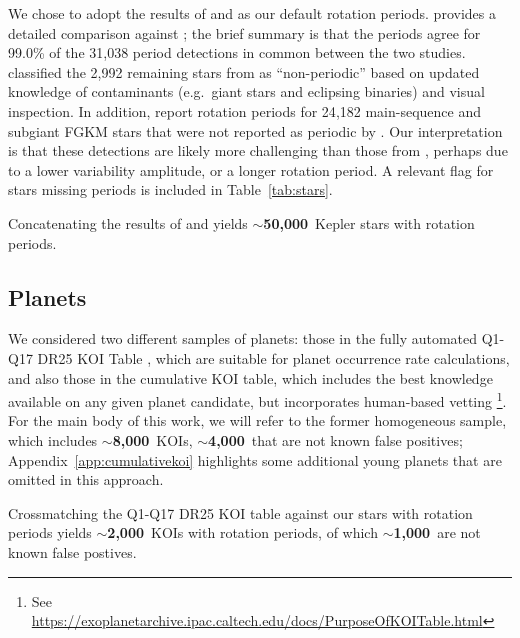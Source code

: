 \documentclass[12pt,twocolumn,tighten]{aastex63}
\newcommand{\nstarswithprot}{{\bf $\sim$50{,}000}}
\newcommand{\nkois}{{\bf $\sim$8{,}000}} %
\newcommand{\nkoisnofp}{{\bf $\sim$4{,}000}} %
\newcommand{\nkoiswithprot}{{\bf $\sim$2{,}000}}
\newcommand{\nkoisnofpwithprot}{{\bf $\sim$1{,}000}}
\begin{document}
We chose to adopt the results of  and
 as our default rotation periods.
 provides a detailed comparison against
; the brief summary is that the periods
agree for 99.0\% of the 31{,}038 period detections in common between
the two studies.   classified the 2{,}992
remaining stars from  as ``non-periodic''
based on updated knowledge of contaminants (e.g.~giant stars and
eclipsing binaries) and visual inspection.  In addition,
 report rotation periods for 24{,}182
main-sequence and subgiant FGKM stars that were not reported as
periodic by .  Our interpretation is that
these detections are likely more challenging than those from
, perhaps due to a lower variability
amplitude, or a longer rotation period.  A relevant flag for stars
missing  periods is included in
Table~\ref{tab:stars}.

Concatenating the results of  and
 yields \nstarswithprot\ Kepler stars with
rotation periods.

\subsection{Planets}
\label{subsec:planetsel}

We considered two different samples of planets: those in the fully
automated Q1-Q17 DR25 KOI Table \citep{Thompson_2018}, which are
suitable for planet occurrence rate calculations, and also those in
the cumulative KOI table, which includes the best knowledge available
on any given planet candidate, but incorporates human-based vetting
\footnote{See
\url{https://exoplanetarchive.ipac.caltech.edu/docs/PurposeOfKOITable.html}}.
For the main body of this work, we will refer to the former
homogeneous sample, which includes \nkois\ KOIs, \nkoisnofp\ that are
not known false positives;
Appendix~\ref{app:cumulativekoi} highlights some additional young
planets that are omitted in this approach.


Crossmatching the Q1-Q17 DR25 KOI table against our stars with
rotation periods yields \nkoiswithprot\ KOIs with rotation periods, of which \nkoisnofpwithprot\ 
are not known false postives.
\end{document}
